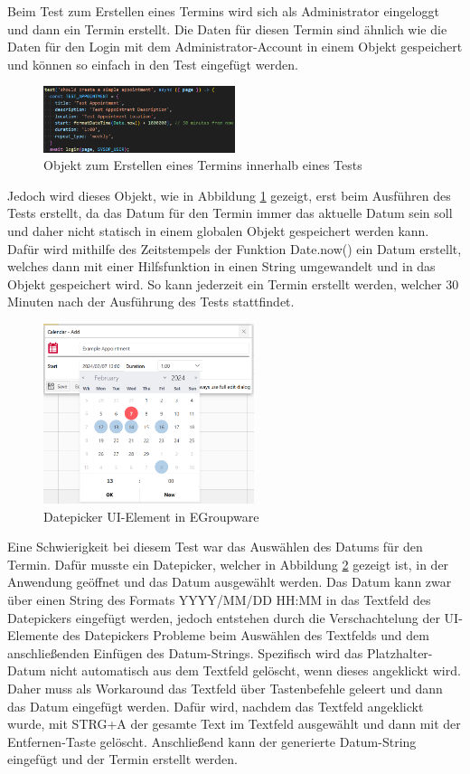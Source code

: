 Beim Test zum Erstellen eines Termins wird sich als Administrator eingeloggt und dann ein Termin erstellt.
Die Daten für diesen Termin sind ähnlich wie die Daten für den Login mit dem Administrator-Account in einem Objekt gespeichert und können so einfach in den Test eingefügt werden.
\begin{figure}[H]
    \centering
    \includegraphics[width=0.5\textwidth]{images/AppointmentObject.png}
    \caption{Objekt zum Erstellen eines Termins innerhalb eines Tests}
    \label{fig:appointment-object}
\end{figure}
Jedoch wird dieses Objekt, wie in Abbildung \ref{fig:appointment-object} gezeigt, erst beim Ausführen des Tests erstellt, da das Datum für den Termin immer das aktuelle Datum sein soll und daher nicht statisch in einem globalen Objekt gespeichert werden kann.
Dafür wird mithilfe des Zeitstempels der Funktion Date.now() ein Datum erstellt, welches dann mit einer Hilfsfunktion in einen String umgewandelt und in das Objekt gespeichert wird.
So kann jederzeit ein Termin erstellt werden, welcher 30 Minuten nach der Ausführung des Tests stattfindet.
\begin{figure}[H]
    \centering
    \includegraphics[width=0.55\textwidth]{images/Datepicker.png}
    \caption{Datepicker UI-Element in EGroupware}
    \label{fig:datepicker}
\end{figure}
Eine Schwierigkeit bei diesem Test war das Auswählen des Datums für den Termin.
Dafür musste ein Datepicker, welcher in Abbildung \ref{fig:datepicker} gezeigt ist, in der Anwendung geöffnet und das Datum ausgewählt werden.
Das Datum kann zwar über einen String des Formats YYYY/MM/DD HH:MM in das Textfeld des Datepickers eingefügt werden, jedoch entstehen durch die Verschachtelung der UI-Elemente des Datepickers Probleme beim Auswählen des Textfelds und dem anschließenden Einfügen des Datum-Strings.
Spezifisch wird das Platzhalter-Datum nicht automatisch aus dem Textfeld gelöscht, wenn dieses angeklickt wird.
Daher muss als Workaround das Textfeld über Tastenbefehle geleert und dann das Datum eingefügt werden.
Dafür wird, nachdem das Textfeld angeklickt wurde, mit STRG+A der gesamte Text im Textfeld ausgewählt und dann mit der Entfernen-Taste gelöscht.
Anschließend kann der generierte Datum-String eingefügt und der Termin erstellt werden.

